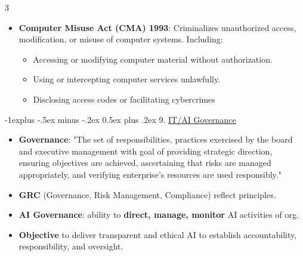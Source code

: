 \documentclass[10pt, landscape]{article}
\makeatletter
\renewcommand{\subsection}{\@startsection{subsection}{2}{0mm}%
                                {-1explus -.5ex minus -.2ex}%
                                {0.5ex plus .2ex}%
                                {\normalfont\normalsize\bfseries}}
\makeatother
\begin{document}
\begin{multicols*}{3}
\begin{itemize}[itemsep=0pt, topsep=0pt]
\item \textbf{Computer Misuse Act (CMA) 1993}: Criminalizes unauthorized access, modification, or misuse of computer systems. Including:
	\begin{itemize}[itemsep=0pt, topsep=0pt]
	\item Accessing or modifying computer material without authorization.
        \item Using or intercepting computer services unlawfully.
        \item Disclosing access codes or facilitating cybercrimes
	\end{itemize}
\end{itemize}



\vfill
\null 

\columnbreak

\subsection{9. \underline{IT/AI Governance}}

\begin{itemize}[itemsep=0pt]
\item \textbf{Governance}: "The set of responsibilities, practices exercised by the board and executive management with goal of providing strategic direction, ensuring objectives are achieved, ascertaining that risks are managed appropriately, and verifying enterprise’s resources are used responsibly." 
\item \textbf{GRC} (Governance, Risk Management, Compliance) reflect principles.
\item \textbf{AI Governance}: ability to \textbf{direct, manage, monitor} AI activities of org.
\item \textbf{Objective} to deliver transparent and ethical AI to establish accountability, responsibility, and oversight.
\end{itemize}


\end{multicols*}
\end{document}
